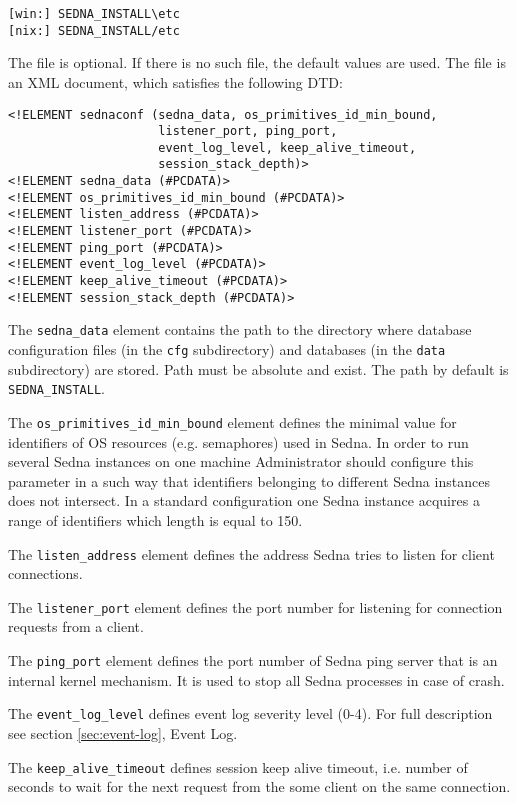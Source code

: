 \documentclass[a4paper,12pt]{article}
\begin{document}
\begin{verbatim}
[win:] SEDNA_INSTALL\etc
[nix:] SEDNA_INSTALL/etc
\end{verbatim}

The file is optional. If there is no such file, the default values are used.
The file is an XML document, which satisfies the following DTD:

\small{
\begin{verbatim}
<!ELEMENT sednaconf (sedna_data, os_primitives_id_min_bound,
                     listener_port, ping_port,
                     event_log_level, keep_alive_timeout,
                     session_stack_depth)>
<!ELEMENT sedna_data (#PCDATA)>
<!ELEMENT os_primitives_id_min_bound (#PCDATA)>
<!ELEMENT listen_address (#PCDATA)>
<!ELEMENT listener_port (#PCDATA)>
<!ELEMENT ping_port (#PCDATA)>
<!ELEMENT event_log_level (#PCDATA)>
<!ELEMENT keep_alive_timeout (#PCDATA)>
<!ELEMENT session_stack_depth (#PCDATA)>
\end{verbatim}}

The \verb!sedna_data! element contains the path to the directory where database
configuration files (in the \verb!cfg! subdirectory) and databases (in the
\verb!data! subdirectory) are stored. Path must be absolute and exist. The path
by default is \verb!SEDNA_INSTALL!.

The \verb!os_primitives_id_min_bound! element defines the minimal value for
identifiers of OS resources (e.g. semaphores) used in Sedna. In order to run
several Sedna instances on one machine Administrator should configure this
parameter in a such way that identifiers belonging to different Sedna instances
does not intersect. In a standard configuration one Sedna instance acquires a
range of identifiers which length is equal to 150.

The \verb!listen_address! element defines the address Sedna tries to listen
for client connections.

The \verb!listener_port! element defines the port number for listening for
connection requests from a client.

The \verb!ping_port! element defines the port number of Sedna ping server that
is an internal kernel mechanism. It is used to stop all Sedna processes in case
of crash.

The \verb!event_log_level! defines event log severity level (0-4). For full
description see section \ref{sec:event-log}, Event Log.

The \verb!keep_alive_timeout! defines session keep alive timeout, i.e. number of
seconds to wait for the next request from the some client on the same
connection.
\end{document}
